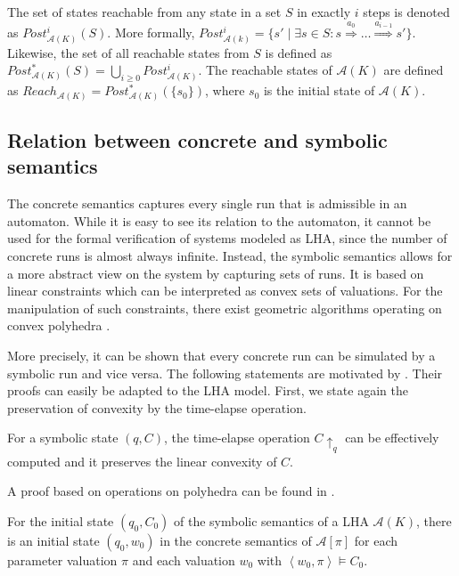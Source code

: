 \documentclass{llncs}
\newcommand{\A}{\ensuremath{\mathcal{A}}}
\newcommand{\Trans}[1]{\ensuremath{\overset{#1}{\Rightarrow}}}
\newcommand{\telapse}{\ensuremath{\uparrow}}
\begin{document}
The set of states reachable from any state in a set $S$ in exactly $i$
steps is denoted as $Post^{i}_{\A(K)}(S)$. More formally,
$Post^{i}_{\A(k)} = \{s' \mid \exists s \in S: s \Trans{a_{0}} \dots
  \Trans{a_{i-1}} s'\}$. Likewise, the set of all reachable states from
$S$ is defined as $Post^{*}_{\A(K)}(S) = \bigcup_{i\geq
  0}Post^{i}_{\A(K)}$. The reachable states of $\A(K)$ are defined as
$Reach_{\A(K)} = Post^{*}_{\A(K)}(\{s_0\})$, where $s_0$ is the
initial state of $\A(K)$.


\subsection{Relation between concrete and symbolic semantics}
The concrete semantics captures every single run that is admissible in
an automaton. While it is easy to see its relation to the automaton,
it cannot be used for the formal verification of systems modeled as
LHA, since the number of concrete runs is almost always
infinite. Instead, the symbolic semantics allows for a more abstract
view on the system by capturing sets of runs. It is based on linear
constraints which can be interpreted as convex sets of valuations. For
the manipulation of such constraints, there exist geometric algorithms
operating on convex polyhedra \cite{CH:78,HPR:97,BHZ:2009}.

More precisely, it can be shown that every concrete run can be
simulated by a symbolic run and vice versa. The following statements
are motivated by \cite{HRSV:2001}. Their proofs can easily be adapted
to the LHA model. First, we state again the preservation of convexity
by the time-elapse operation.

\begin{lemma}\label{lem:elapse}
  For a symbolic state $(q,C)$, the time-elapse operation $C
  \telapse_q$ can be effectively computed and it preserves the
  linear convexity of $C$.
\end{lemma}
%
A proof based on operations on polyhedra can be found in
\cite{HPR:97}.

\begin{lemma}\label{lem:init_sc}
  For the initial state $(q_0, C_0)$ of the symbolic semantics of a
  LHA $\A(K)$, there is an initial state $(q_0, w_0)$ in the
  concrete semantics of $\A[\pi]$ for each parameter
  valuation $\pi$ and each valuation $w_0$ with $\left<w_0, \pi\right>
  \models C_0$.
\end{lemma}
\end{document}
